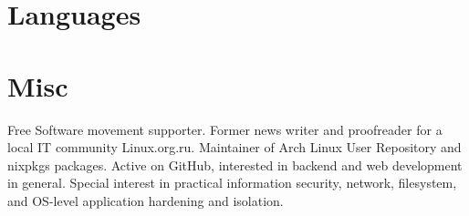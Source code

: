 \section{Languages}

\section{Misc}

Free Software movement supporter. Former news writer and proofreader for a local IT community
Linux.org.ru. Maintainer of Arch Linux User Repository and nixpkgs packages. Active on GitHub,
interested in backend and web development in general. Special interest in practical information
security, network, filesystem, and OS-level application hardening and isolation.
